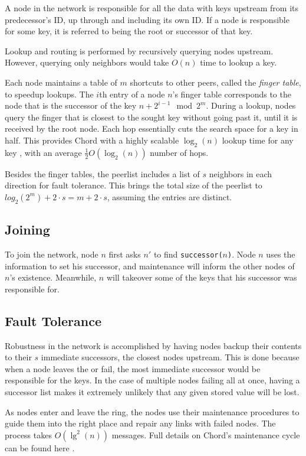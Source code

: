 \documentclass[10pt,letterpaper,twoside]{report}
\begin{document}
A node in the network is responsible for all the data with keys upstream from its predecessor's ID, up through and including its own ID.  
If a node is responsible for some key, it is referred to being the root or successor of that key.

Lookup and routing is performed by recursively querying nodes upstream.
However, querying only neighbors would take $O(n)$ time to lookup a key.


Each node maintains a table of $m$ shortcuts to other peers, called the \textit{finger table}, to speedup lookups.
The $i$th entry of a node $n$'s finger table corresponds to the node that is the successor of the key $n+2^{i-1} \mod 2^m $.  
During a lookup,  nodes query the finger that is closest to the sought key without going past it, until it is received by the root node.
Each hop essentially cuts the search space for a key in half.
This provides Chord with a highly scalable $\log_2(n)$ lookup time for any key \cite{chord}, with an average $\frac{1}{2}O(\log_{2}(n))$ number of hops.

Besides the finger tables, the peerlist includes a list of $s$ neighbors in each direction for fault tolerance.
This brings the total size of the peerlist to $log_{2}(2^{m})  + 2 \cdot s =  m  + 2 \cdot s$, assuming the entries are distinct.

\subsection*{Joining}
To join the network, node $n$ first asks $n'$ to find \texttt{successor($ n $)}. 
Node $n$ uses the information to set his successor, and maintenance will inform the other nodes of $n$'s existence.
Meanwhile, $n$ will takeover some of the keys that his successor was responsible for.

\subsection*{Fault Tolerance}
Robustness in the network is accomplished by having nodes backup their contents to their $s$ immediate successors, the closest nodes upstream. 
This is done because when a node leaves the or fail, the most immediate successor would be responsible for the keys.
In the case of multiple nodes failing all at once, having a successor list makes it extremely unlikely that any given stored value will be lost.

As nodes enter and leave the ring, the nodes use their maintenance procedures to guide them into the right place and repair any links with failed nodes.  
The process takes $O(\lg^{2}(n))$ messages.
Full details on Chord's maintenance cycle can be found here \cite{chord}.
\end{document}

